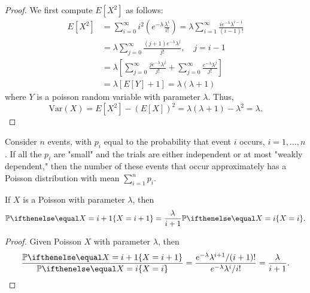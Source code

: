 \documentclass[a4paper,8pt]{article}
\begin{document}
\begin{outline}
      \begin{proof}
        We first compute \(E[X^2]\) as follows:
        \begin{align*}
          E[X^2] &= \sum_{i=0}^{\infty}i^2\left(e^{-\lambda}\frac{\lambda^i}{i!}\right)
                  = \lambda\sum_{i=1}^{\infty}\frac{ie^{-\lambda}\lambda^{i-1}}{(i-1)!} \\
                 &= \lambda\sum_{j=0}^{\infty}\frac{(j+1)e^{-\lambda}\lambda^j}{j!},\quad j=i-1 \\
                 &= \lambda\left[\sum_{j=0}^{\infty}\frac{je^{-\lambda}\lambda^j}{j!} +
                    \sum_{j=0}^{\infty}\frac{e^{-\lambda}\lambda^j}{j!}\right] \\
                 &= \lambda\left[E[Y] + 1\right]
                  = \lambda(\lambda + 1)
        \end{align*}
        where \(Y\) is a poisson random variable with parameter \(\lambda\). Thus,
        \[\text{Var}(X) = E[X^2] - (E[X])^2 = \lambda(\lambda+1) - \lambda^2 = \lambda\text{.}\]
      \end{proof}

      Consider \(n\) events, with \(p_i\) equal to the probability that event \(i\) occurs, \(i=1,\ldots,n\).
      If all the \(p_i\) are "small" and the trials are either independent or at most "weakly dependent,"
      then the number of these events that occur approximately has a Poisson distribution with mean \(\sum_{i=1}^np_i\).

      If \(X\) is a Poisson with parameter \(\lambda\), then \[ \bbp[X=i+1] = \frac{\lambda}{i+1}\bbp[X=i]\text{.} \]

      \begin{proof}
        Given Poisson \(X\) with parameter \(\lambda\), then
        \[
          \frac{\bbp[X=i+1]}{\bbp[X=i]}
          = \frac{e^{-\lambda}\lambda^{i+1}/(i+1)!}{e^{-\lambda}\lambda^i/i!}
          = \frac{\lambda}{i+1}\text{.}
        \]
      \end{proof}

\end{outline}
\end{document}
